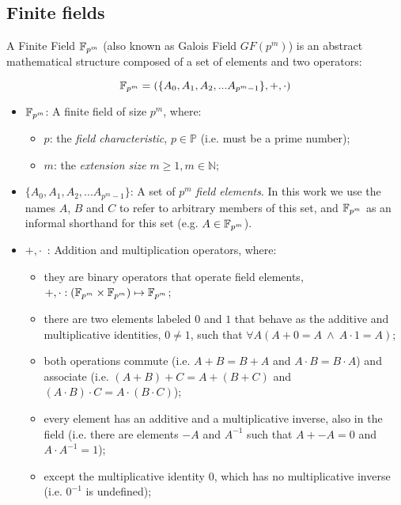 \subsection{Finite fields}

A Finite Field $\mathbb{F}_{p^m}$ (also known as Galois Field $GF(p^m)$) is an abstract mathematical structure composed of a set of elements and two operators:

\[
\mathbb{F}_{p^m} = (\{A_0, A_1, A_2, ... A_{p^m-1}\}, +, \cdot)
\]

\begin{itemize}
\item $\mathbb{F}_{p^m}$: A finite field of size $p^m$, where:
    \begin{itemize}
    \item $p$: the \emph{field characteristic}, $p \in \mathbb{P}$ (i.e. must be a prime number);
    \item $m$: the \emph{extension size} $m \geq 1, m \in \mathbb{N}$;
    \end{itemize}
\item $\{A_0, A_1, A_2, ... A_{p^m-1}\}$: A set of $p^m$ \emph{field elements}. In this work we use the names $A$, $B$ and $C$ to refer to arbitrary members of this set, and $\mathbb{F}_{p^m}$ as an informal shorthand for this set (e.g. $A \in \mathbb{F}_{p^m}$).
\item $+, \cdot$~: Addition and multiplication operators, where:
    \begin{itemize}
    \item they are binary operators that operate field elements, $+, \cdot : (\mathbb{F}_{p^m} \times \mathbb{F}_{p^m}) \mapsto \mathbb{F}_{p^m}$;
    \item there are two elements labeled $0$ and $1$ that behave as the additive and multiplicative identities, $0 \neq 1$, such that $\forall A (A + 0 = A~\wedge~A \cdot 1 = A)$;
    \item both operations commute (i.e. $A + B = B + A$ and $A \cdot B = B \cdot A$) and associate (i.e. $(A + B) + C = A + (B + C)$ and $(A \cdot B) \cdot C = A \cdot (B \cdot C)$);
    \item every element has an additive and a multiplicative inverse, also in the field (i.e. there are elements $-A$ and $A^{-1}$ such that $A + -A = 0$ and $A \cdot A^{-1} = 1$);
    \item except the multiplicative identity $0$, which has no multiplicative inverse (i.e. $0^{-1}$ is undefined);
    \end{itemize}
\end{itemize}

